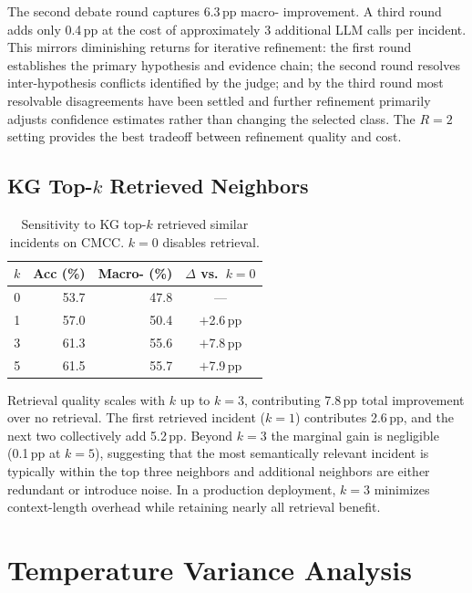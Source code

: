The second debate round captures 6.3\,pp macro-\fone{} improvement. A third round adds only
0.4\,pp at the cost of approximately 3 additional LLM calls per incident. This mirrors
diminishing returns for iterative refinement: the first round establishes the primary
hypothesis and evidence chain; the second round resolves inter-hypothesis conflicts identified
by the judge; and by the third round most resolvable disagreements have been settled and further
refinement primarily adjusts confidence estimates rather than changing the selected class. The
$R{=}2$ setting provides the best tradeoff between refinement quality and cost.

\subsection{KG Top-\texorpdfstring{$k$}{k} Retrieved Neighbors}

\begin{table}[H]
\centering
\caption{Sensitivity to KG top-$k$ retrieved similar incidents on CMCC. $k{=}0$ disables
retrieval.}
\label{tab:sensitivity-topk}
\begin{tabular}{crrc}
\toprule
$k$ & \textbf{Acc (\%)} & \textbf{Macro-\fone{} (\%)} & \textbf{$\Delta$\fone{} vs.\ $k{=}0$} \\
\midrule
0 & 53.7 & 47.8 & ---        \\
1 & 57.0 & 50.4 & $+$2.6\,pp \\
3 & 61.3 & 55.6 & $+$7.8\,pp \\
5 & 61.5 & 55.7 & $+$7.9\,pp \\
\bottomrule
\end{tabular}
\end{table}

Retrieval quality scales with $k$ up to $k{=}3$, contributing 7.8\,pp total improvement over
no retrieval. The first retrieved incident ($k{=}1$) contributes 2.6\,pp, and the next two
collectively add 5.2\,pp. Beyond $k{=}3$ the marginal gain is negligible (0.1\,pp at $k{=}5$),
suggesting that the most semantically relevant incident is typically within the top three
neighbors and additional neighbors are either redundant or introduce noise. In a production
deployment, $k{=}3$ minimizes context-length overhead while retaining nearly all retrieval
benefit.

\section{Temperature Variance Analysis}
\label{sec:temperature}

